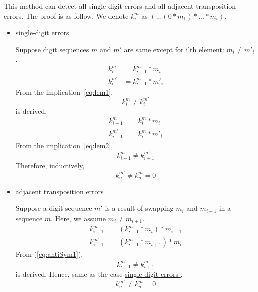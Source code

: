 This method can detect all single-digit
 errors and all adjacent transposition errors.
The proof is as follow.
We denote $k_i^{m}$ as $(...(0*m_1)*...*m_i)$.
\begin{itemize}
 \item \underline{single-digit errors }

       Suppose digit sequences $m$ and $m'$ are same except for i'th element:
       $m_i \neq m'_i$.
       \begin{align*}
	k_i^{m} &= k_{i-1}^{m} * m_i \\
	k_i^{m'} &= k_{i-1}^{m} * m'_i 
       \end{align*}
       From the implication~\ref{eq:lem1},
       $$k_i^{m} \neq k_i^{m'}$$ 
       is derived.
       \begin{align*}
	k_{i+1}^{m} &= k_i^{m} * m_i \\
	k_{i+1}^{m'} &= k_i^{m} * m'_i 
       \end{align*}
       From the implication~\ref{eq:lem2},
       $$k_{i+1}^{m} \neq k_{i+1}^{m'}$$
       Therefore, inductively,
       $$k_{n}^{m'} \neq k_{n}^{m} = 0$$

 \item \underline{ adjacent transposition errors}

       Suppose a digit sequence $m'$ is a result of
       swapping $m_i$ and $m_{i+1}$ in a sequence $m$.
       Here, we assume $m_i \neq m_{i+1}$.
       \begin{align*}
	k_{i+1}^{m} &= (k_{i-1}^{m}* m_i) * m_{i+1} \\
	k_{i+1}^{m'} &= (k_{i-1}^{m}* m_{i+1}) * m_i
       \end{align*}
       From (\ref{eq:antiSym1}),
       $$k_{i+1}^{m} \neq k_{i+1}^{m'}$$ 
       is derived.
       Hence, same as the  case \underline{single-digit errors },
       $$k_{n}^{m'} \neq k_{n}^{m} = 0$$
\end{itemize}

